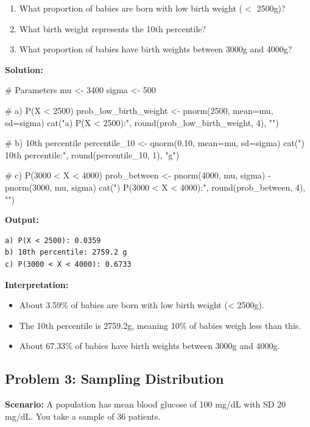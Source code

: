 \documentclass[11pt]{article}
\begin{document}
\begin{enumerate}[label=\alph*)]
\item What proportion of babies are born with low birth weight ($<$ 2500g)?
\item What birth weight represents the 10th percentile?
\item What proportion of babies have birth weights between 3000g and 4000g?
\end{enumerate}

\textbf{Solution:}

\begin{rcode}
# Parameters
mu <- 3400
sigma <- 500

# a) P(X < 2500)
prob_low_birth_weight <- pnorm(2500, mean=mu, sd=sigma)
cat("a) P(X < 2500):", round(prob_low_birth_weight, 4), "\n")

# b) 10th percentile
percentile_10 <- qnorm(0.10, mean=mu, sd=sigma)
cat("\nb) 10th percentile:", round(percentile_10, 1), "g\n")

# c) P(3000 < X < 4000)
prob_between <- pnorm(4000, mu, sigma) - pnorm(3000, mu, sigma)
cat("\nc) P(3000 < X < 4000):", round(prob_between, 4), "\n")
\end{rcode}

\begin{routput}
\textbf{Output:}
\begin{verbatim}
a) P(X < 2500): 0.0359
b) 10th percentile: 2759.2 g
c) P(3000 < X < 4000): 0.6733
\end{verbatim}
\end{routput}

\textcolor{correctgreen}{\textbf{Interpretation:}}
\begin{itemize}
\item About 3.59\% of babies are born with low birth weight (< 2500g).
\item The 10th percentile is 2759.2g, meaning 10\% of babies weigh less than this.
\item About 67.33\% of babies have birth weights between 3000g and 4000g.
\end{itemize}

\subsection{Problem 3: Sampling Distribution}

\textbf{Scenario:} A population has mean blood glucose of 100 mg/dL with SD 20 mg/dL. You take a sample of 36 patients.
\end{document}
